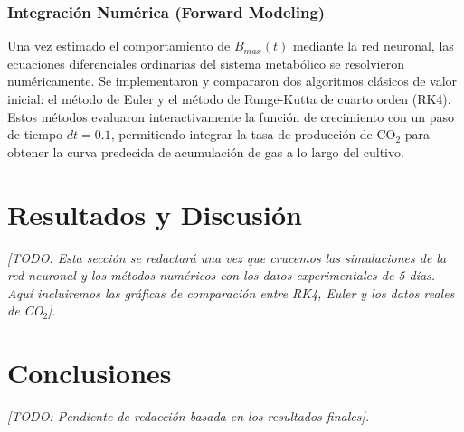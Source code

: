 \subsubsection{Integración Numérica (Forward Modeling)}
Una vez estimado el comportamiento de $B_{max}(t)$ mediante la red neuronal, las ecuaciones diferenciales ordinarias del sistema metabólico se resolvieron numéricamente. Se implementaron y compararon dos algoritmos clásicos de valor inicial: el método de Euler y el método de Runge-Kutta de cuarto orden (RK4). Estos métodos evaluaron interactivamente la función de crecimiento con un paso de tiempo $dt = 0.1$, permitiendo integrar la tasa de producción de CO$_2$ para obtener la curva predecida de acumulación de gas a lo largo del cultivo.

\section{Resultados y Discusión}
\textit{[TODO: Esta sección se redactará una vez que crucemos las simulaciones de la red neuronal y los métodos numéricos con los datos experimentales de 5 días. Aquí incluiremos las gráficas de comparación entre RK4, Euler y los datos reales de CO$_2$].}

\section{Conclusiones}
\textit{[TODO: Pendiente de redacción basada en los resultados finales].}
